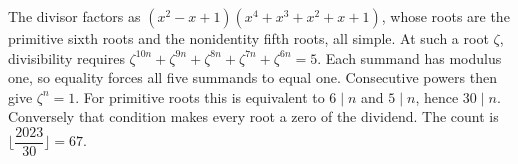 The divisor factors as $(x^2-x+1)(x^4+x^3+x^2+x+1)$, whose roots are the primitive sixth roots and the nonidentity fifth roots, all simple. At such a root $\zeta$, divisibility requires $\zeta^{10n}+\zeta^{9n}+\zeta^{8n}+\zeta^{7n}+\zeta^{6n}=5$. Each summand has modulus one, so equality forces all five summands to equal one. Consecutive powers then give $\zeta^n=1$. For primitive roots this is equivalent to $6\mid n$ and $5\mid n$, hence $30\mid n$. Conversely that condition makes every root a zero of the dividend. The count is $\lfloor\dfrac{2023}{30}\rfloor=\boxed{67}$.
